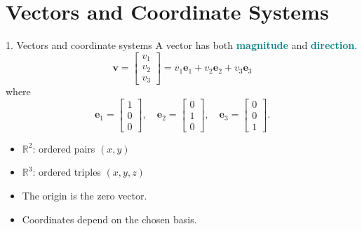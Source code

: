\documentclass[aspectratio=169,11pt]{beamer}
\newcommand{\R}{\mathbb{R}}
\newcommand{\vect}[1]{\bm{#1}}
\newcommand{\important}[1]{\textcolor{teal}{\textbf{#1}}}
\begin{document}
\section{Vectors and Coordinate Systems}
\begin{frame}{1. Vectors and coordinate systems}
A vector has both \important{magnitude} and \important{direction}.
\[
\vect v=
\begin{bmatrix}v_1\\v_2\\v_3\end{bmatrix}
=v_1\vect e_1+v_2\vect e_2+v_3\vect e_3
\]
where
\[
\vect e_1=\begin{bmatrix}1\\0\\0\end{bmatrix},\quad
\vect e_2=\begin{bmatrix}0\\1\\0\end{bmatrix},\quad
\vect e_3=\begin{bmatrix}0\\0\\1\end{bmatrix}.
\]
\begin{itemize}
\item $\R^2$: ordered pairs $(x,y)$
\item $\R^3$: ordered triples $(x,y,z)$
\item The origin is the zero vector.
\item Coordinates depend on the chosen basis.
\end{itemize}
\end{frame}
\end{document}
